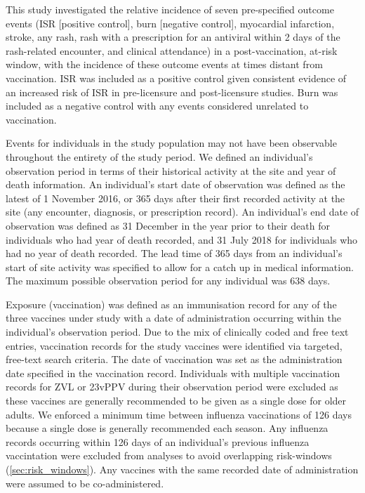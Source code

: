 \documentclass[review, endfloat]{elsarticle}
\begin{document}
This study investigated the relative incidence of seven pre-specified outcome events (ISR [positive control], burn [negative control], myocardial infarction, stroke, any rash, rash with a prescription for an antiviral within 2 days of the rash-related encounter, and clinical attendance) in a post-vaccination, at-risk window, with the incidence of these outcome events at times distant from vaccination. ISR was included as a positive control given consistent evidence of an increased risk of ISR in pre-licensure and post-licensure studies. Burn was included as a negative control with any events considered unrelated to vaccination.  

Events for individuals in the study population may not have been observable throughout the entirety of the study period. We defined an individual’s observation period in terms of their historical activity at the site and year of death information. An individual’s start date of observation was defined as the latest of 1 November 2016, or 365 days after their first recorded activity at the site (any encounter, diagnosis, or prescription record). An individual’s end date of observation was defined as 31 December in the year prior to their death for individuals who had year of death recorded, and 31 July 2018 for individuals who had no year of death recorded. The lead time of 365 days from an individual’s start of site activity was specified to allow for a catch up in medical information. The maximum possible observation period for any individual was 638 days.

Exposure (vaccination) was defined as an immunisation record for any of the three vaccines under study with a date of administration occurring within the individual’s observation period. Due to the mix of clinically coded and free text entries, vaccination records for the study vaccines were identified via targeted, free-text search criteria. The date of vaccination was set as the administration date specified in the vaccination record. Individuals with multiple vaccination records for ZVL or 23vPPV during their observation period were excluded as these vaccines are generally recommended to be given as a single dose for older adults. We enforced a minimum time between influenza vaccinations of 126 days because a single dose is generally recommended each season. Any influenza records occurring within 126 days of an individual’s previous influenza vaccintation were excluded from analyses to avoid overlapping risk-windows (\autoref{sec:risk_windows}). Any vaccines with the same recorded date of administration were assumed to be co-administered.
\end{document}
